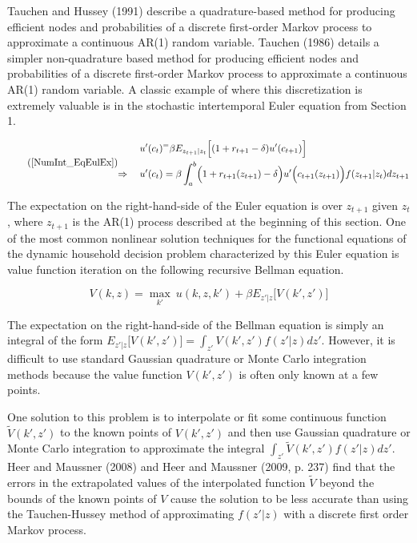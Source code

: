 \documentclass[11pt]{article}
\begin{document}
Tauchen and Hussey (1991) describe a quadrature-based method for
producing efficient nodes and probabilities of a discrete first-order
Markov process to approximate a continuous AR(1) random variable.
Tauchen (1986) details a simpler non-quadrature based method for
producing efficient nodes and probabilities of a discrete first-order
Markov process to approximate a continuous AR(1) random variable. A
classic example of where this discretization is extremely valuable is in
the stochastic intertemporal Euler equation from Section 1.

\begin{equation}\tag{\ref{NumInt_EqEulEx}}
  \begin{split}
    u'(c_t) &^= \beta E_{z_{t+1}|z_t}\Bigl[(1+r_{t+1}-\delta)u'(c_{t+1})\Bigr] \\
    \Rightarrow\quad u'(c_t) &= \beta\int_a^b \Bigl(1+r_{t+1}(z_{t+1})-\delta\Bigr)u'\Bigl(c_{t+1}(z_{t+1})\Bigr)f(z_{t+1}|z_t)dz_{t+1}
  \end{split}
\end{equation}

The expectation on the right-hand-side of the Euler equation is over
\(z_{t+1}\) given \(z_t\), where \(z_{t+1}\) is the AR(1) process
described at the beginning of this section. One of the most common
nonlinear solution techniques for the functional equations of the
dynamic household decision problem characterized by this Euler equation
is value function iteration on the following recursive Bellman equation.

\begin{equation}\label{NumInt_EqBellman}
  V(k,z) = \max_{k'}\:u(k,z,k') + \beta E_{z'|z}\bigl[V(k',z')\bigr]
\end{equation}

The expectation on the right-hand-side of the Bellman equation is simply
an integral of the form
\(E_{z'|z}\bigl[V(k',z')\bigr] = \int_{z'}V(k',z')f(z'|z)dz'\). However,
it is difficult to use standard Gaussian quadrature or Monte Carlo
integration methods because the value function \(V(k',z')\) is often
only known at a few points.

One solution to this problem is to interpolate or fit some continuous
function \(\tilde{V}(k',z')\) to the known points of \(V(k',z')\) and
then use Gaussian quadrature or Monte Carlo integration to approximate
the integral \(\int_{z'}\tilde{V}(k',z')f(z'|z)dz'\). Heer and Maussner
(2008) and Heer and Maussner (2009, p. 237) find that the errors in the
extrapolated values of the interpolated function \(\tilde{V}\) beyond
the bounds of the known points of \(V\) cause the solution to be less
accurate than using the Tauchen-Hussey method of approximating
\(f(z'|z)\) with a discrete first order Markov process.
\end{document}
